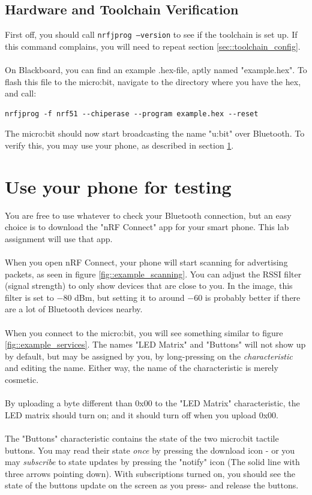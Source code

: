 \documentclass[11pt,a4paper]{article}
\begin{document}
\subsection{Hardware and Toolchain Verification}
First off, you should call \texttt{nrfjprog --version} to see if the toolchain is set up. If this command complains, you will need to repeat section \ref{sec::toolchain_config}.\\
\\
On Blackboard, you can find an example .hex-file, aptly named "example.hex". To flash this file to the micro:bit, navigate to the directory where you have the hex, and call:
\begin{verbatim}
nrfjprog -f nrf51 --chiperase --program example.hex --reset
\end{verbatim}
The micro:bit should now start broadcasting the name "u:bit" over Bluetooth. To verify this, you may use your phone, as described in section \ref{sec::phone_verify}.

\section{Use your phone for testing}
\label{sec::phone_verify}
You are free to use whatever to check your Bluetooth connection, but an easy choice is to download the "nRF Connect" app for your smart phone. This lab assignment will use that app.\\
\\
When you open nRF Connect, your phone will start scanning for advertising packets, as seen in figure \ref{fig::example_scanning}. You can adjust the RSSI filter (signal strength) to only show devices that are close to you. In the image, this filter is set to $-80$ dBm, but setting it to around $-60$ is probably better if there are a lot of Bluetooth devices nearby.\\
\\
When you connect to the micro:bit, you will see something similar to figure \ref{fig::example_services}. The names "LED Matrix" and "Buttons" will not show up by default, but may be assigned by you, by long-pressing on the \textit{characteristic} and editing the name. Either way, the name of the characteristic is merely cosmetic.\\
\\
By uploading a byte different than 0x00 to the "LED Matrix" characteristic, the LED matrix should turn on; and it should turn off when you upload 0x00.\\
\\
The "Buttons" characteristic contains the state of the two micro:bit tactile buttons. You may read their state \textit{once} by pressing the download icon - or you may \textit{subscribe} to state updates by pressing the "notify" icon (The solid line with three arrows pointing down). With subscriptions turned on, you should see the state of the buttons update on the screen as you press- and release the buttons.
\end{document}
